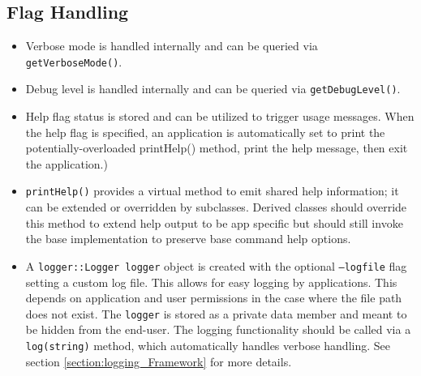 \subsection*{Flag Handling}
\begin{itemize}\itemsep0em
	\item Verbose mode is handled internally and can be queried via \texttt{getVerboseMode()}.
	\item Debug level is handled internally and can be queried via \texttt{getDebugLevel()}.
	\item Help flag status is stored and can be utilized to trigger usage messages. When the help flag is specified, an application is automatically set to print the potentially-overloaded printHelp() method, print the help message, then exit the application.)
	\item \texttt{printHelp()} provides a virtual method to emit shared help information; it can be extended or overridden by subclasses. Derived classes should override this method to extend help output to be app specific but should still invoke the base implementation to preserve base command help options.
	\item A \texttt{logger::Logger logger} object is created with the optional \texttt{--logfile} flag setting a custom log file. This allows for easy logging by applications. This depends on application and user permissions in the case where the file path does not exist. The \texttt{logger} is stored as a private data member and meant to be hidden from the end-user. The logging functionality should be called via a \texttt{log(string)} method, which automatically handles verbose handling. See section \ref{section:logging_Framework} for more details.
\end{itemize}

